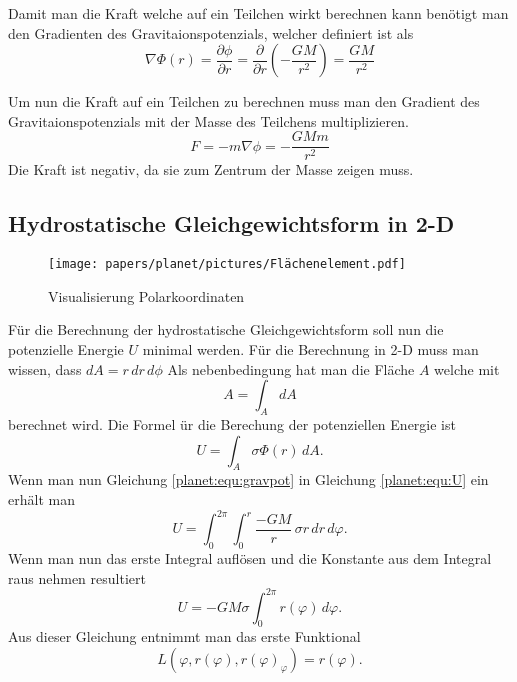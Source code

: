 Damit man die Kraft welche auf ein Teilchen wirkt berechnen kann benötigt man den Gradienten des Gravitaionspotenzials, welcher definiert ist als
\begin{equation}
	\nabla \Phi (r) = \frac{\partial \phi}{\partial r} = \frac{\partial}{\partial r} (-\frac{GM}{r^2}) = \frac{GM}{r^2}
\end{equation}

Um nun die Kraft auf ein Teilchen zu berechnen muss man den Gradient des Gravitaionspotenzials mit der Masse des Teilchens multiplizieren.
\begin{equation}
	F = -m\nabla \phi = -\frac{GMm}{r^2}
\end{equation}
Die Kraft ist negativ, da sie zum Zentrum der Masse zeigen muss.


\subsection{Hydrostatische Gleichgewichtsform in 2-D}
\begin{figure}
	\centering
	\texttt{[image: papers/planet/pictures/Flächenelement.pdf]}
	\caption{Visualisierung Polarkoordinaten}
\end{figure}
Für die Berechnung der hydrostatische Gleichgewichtsform soll nun die potenzielle Energie \(U\) minimal werden.
Für die Berechnung in 2-D muss man wissen, dass \(dA = r \, dr \, d\phi\)
Als nebenbedingung hat man die Fläche \(A\) welche mit 
\begin{equation}
	A = \int_{A}^{} dA
	\label{planet:equ:A}
\end{equation}
berechnet wird.
Die Formel ür die Berechung der potenziellen Energie ist
\begin{equation*}
	U = \int_{A} \sigma  \Phi (r) \, dA.
	\label{planet:equ:U}
\end{equation*}
Wenn man nun Gleichung \ref{planet:equ:gravpot} in Gleichung \ref{planet:equ:U} ein erhält man
\begin{equation*}
	U = \int_{0}^{2\pi}\int_{0}^{r} \frac{-GM}{r} \, \sigma r \, dr \, d\varphi.
\end{equation*}
Wenn man nun das erste Integral auflösen und die Konstante aus dem Integral raus nehmen resultiert 
\begin{equation}
	U =-GM\sigma \int_{0}^{2\pi} r(\varphi) \, d\varphi .
\end{equation}
Aus dieser Gleichung entnimmt man das erste Funktional
\begin{equation}
	L(\varphi ,r(\varphi),r(\varphi)_\varphi) = r(\varphi).
\end{equation}
